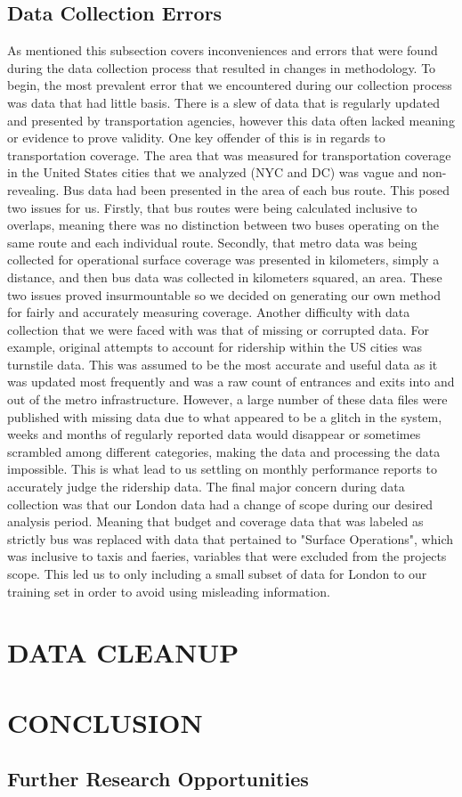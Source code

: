 \documentclass[12pt]{article}
\begin{document}
\begin{multicols}{2}
\subsection{Data Collection Errors}
As mentioned this subsection covers inconveniences and errors that were found during the data collection process that resulted in changes in methodology. To begin, the most prevalent error that we encountered during our collection process was data that had little basis. There is a slew of data that is regularly updated and presented by transportation agencies, however this data often lacked meaning or evidence to prove validity. One key offender of this is in regards to transportation coverage. The area that was measured for transportation coverage in the United States cities that we analyzed (NYC and DC) was vague and non-revealing. Bus data had been presented in the area of each bus route. This posed two issues for us. Firstly, that bus routes were being calculated inclusive to overlaps, meaning there was no distinction between two buses operating on the same route and each individual route. Secondly, that metro data was being collected for operational surface coverage was presented in kilometers, simply a distance, and then bus data was collected in kilometers squared, an area. These two issues proved insurmountable so we decided on generating our own method for fairly and accurately measuring coverage. Another difficulty with data collection that we were faced with was that of missing or corrupted data. For example, original attempts to account for ridership within the US cities was turnstile data. This was assumed to be the most accurate and useful data as it was updated most frequently and was a raw count of entrances and exits into and out of the metro infrastructure. However, a large number of these data files were published with missing data due to what appeared to be a glitch in the system, weeks and months of regularly reported data would disappear or sometimes scrambled among different categories, making the data and processing the data impossible. This is what lead to us settling on monthly performance reports to accurately judge the ridership data. The final major concern during data collection was that our London data had a change of scope during our desired analysis period. Meaning that budget and coverage data that was labeled as strictly bus was replaced with data that pertained to "Surface Operations", which was inclusive to taxis and faeries, variables that were excluded from the projects scope. This led us to only including a small subset of data for London to our training set in order to avoid using misleading information.

\section{DATA CLEANUP}
\section{CONCLUSION}

\subsection{Further Research Opportunities}

	\end{multicols}
\end{document}
